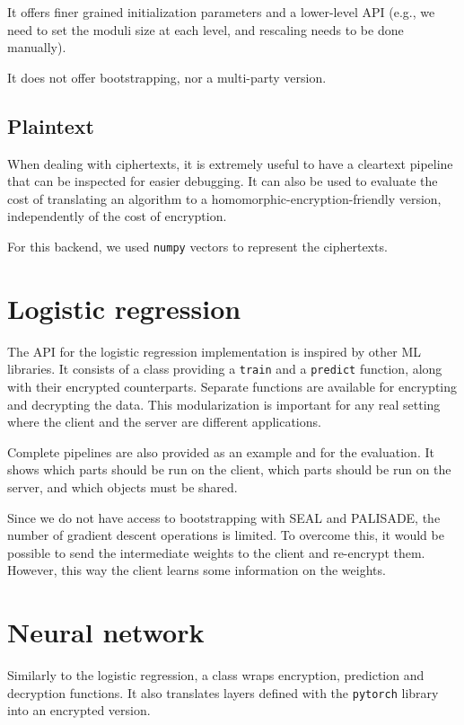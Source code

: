 \documentclass[a4paper,11pt,oneside]{report}
\begin{document}
It offers finer grained initialization parameters and a lower-level API (e.g., we need to set the moduli size at each level, and rescaling needs to be done manually).

It does not offer bootstrapping, nor a multi-party version.

\subsection{Plaintext}

When dealing with ciphertexts, it is extremely useful to have a cleartext pipeline that can be inspected for easier debugging. 
It can also be used to evaluate the cost of translating an algorithm to a homomorphic-encryption-friendly version, independently of the cost of encryption. 

For this backend, we used \texttt{numpy} vectors to represent the ciphertexts.

\section{Logistic regression}

The API for the logistic regression implementation is inspired by other ML libraries. 
It consists of a class providing a \texttt{train} and a \texttt{predict} function, along with their encrypted counterparts. 
Separate functions are available for encrypting and decrypting the data. 
This modularization is important for any real setting where the client and the server are different applications.

Complete pipelines are also provided as an example and for the evaluation.
It shows which parts should be run on the client, which parts should be run on the server, and which objects must be shared.

Since we do not have access to bootstrapping with SEAL and PALISADE, the number of gradient descent operations is limited. 
To overcome this, it would be possible to send the intermediate weights to the client and re-encrypt them. 
However, this way the client learns some information on the weights.

\section{Neural network}

Similarly to the logistic regression, a class wraps encryption, prediction and decryption functions. 
It also translates layers defined with the \texttt{pytorch} library into an encrypted version.
\end{document}
